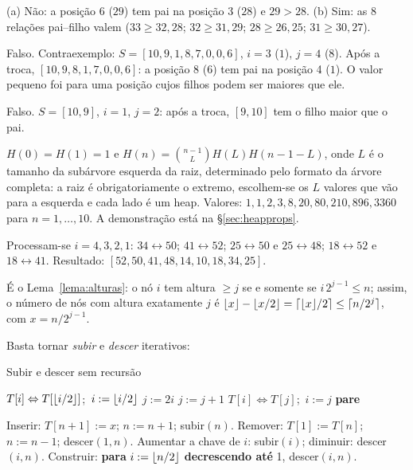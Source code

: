  (a) Não: a posição 6 ($29$) tem pai na posição 3 ($28$) e $29>28$. (b) Sim: as 8 relações pai--filho valem ($33\ge32,28$; $32\ge31,29$; $28\ge26,25$; $31\ge30,27$).

 Falso. Contraexemplo: $S=[10,9,1,8,7,0,0,6]$, $i=3$ ($1$), $j=4$ ($8$). Após a troca, $[10,9,8,1,7,0,0,6]$: a posição 8 ($6$) tem pai na posição 4 ($1$). O valor pequeno foi para uma posição cujos filhos podem ser maiores que ele.

 Falso. $S=[10,9]$, $i=1$, $j=2$: após a troca, $[9,10]$ tem o filho maior que o pai.

 $H(0)=H(1)=1$ e $H(n)=\binom{n-1}{L}H(L)H(n-1-L)$, onde $L$ é o tamanho da subárvore esquerda da raiz, determinado pelo formato da árvore completa: a raiz é obrigatoriamente o extremo, escolhem-se os $L$ valores que vão para a esquerda e cada lado é um heap. Valores: $1,1,2,3,8,20,80,210,896,3360$ para $n=1,\dots,10$. A demonstração está na §\ref{sec:heapprops}.

 Processam-se $i=4,3,2,1$: $34\leftrightarrow50$; $41\leftrightarrow52$; $25\leftrightarrow50$ e $25\leftrightarrow48$; $18\leftrightarrow52$ e $18\leftrightarrow41$. Resultado: $[52,50,41,48,14,10,18,34,25]$.

 É o Lema~\ref{lema:alturas}: o nó $i$ tem altura $\ge j$ se e somente se $i\,2^{j-1}\le n$; assim, o número de nós com altura exatamente $j$ é $\lfloor x\rfloor-\lfloor x/2\rfloor=\lceil\lfloor x\rfloor/2\rceil\le\lceil n/2^j\rceil$, com $x=n/2^{j-1}$.

 Basta tornar \emph{subir} e \emph{descer} iterativos:
\begin{pseudo}{Subir e descer sem recursão}
\begin{algorithmic}
   \State $T[i]\Leftrightarrow T[\lfloor i/2\rfloor]$;\ $i:=\lfloor i/2\rfloor$ \EndWhile
\EndProcedure
{}
    \State $j:=2i$
     \State $j:=j+1$ \EndIf
     \State $T[i]\Leftrightarrow T[j]$;\ $i:=j$ \Else \State \textbf{pare} \EndIf
  \EndWhile
\EndProcedure
\end{algorithmic}
\end{pseudo}
Inserir: $T[n+1]:=x$; $n:=n+1$; subir$(n)$. Remover: $T[1]:=T[n]$; $n:=n-1$; descer$(1,n)$. Aumentar a chave de $i$: subir$(i)$; diminuir: descer$(i,n)$. Construir: \textbf{para} $i:=\lfloor n/2\rfloor$ \textbf{decrescendo até} 1, descer$(i,n)$.

